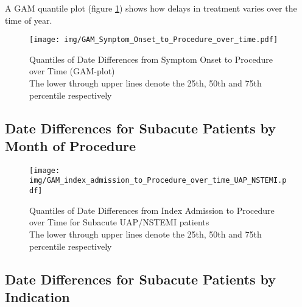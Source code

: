 \documentclass[presentation,xcolor=pdftex,dvipsnames,table,11pt]{beamer}
\begin{document}
\begin{tiny}
\begin{frame}
A GAM quantile plot (figure \ref{GAM: Date Differences from Symptom Onset to Procedure over Time}) shows how delays in treatment varies over the time of year.

\begin{figure}
  \centering
  \caption{Quantiles of Date Differences from Symptom Onset to Procedure over Time (GAM-plot)\\
  The lower through upper lines denote the 25th, 50th and 75th percentile respectively}
  \label{GAM: Date Differences from Symptom Onset to Procedure over Time}
\texttt{[image: img/GAM\_Symptom\_Onset\_to\_Procedure\_over\_time.pdf]}\end{figure}
\end{frame}





\subsection{Date Differences for Subacute Patients by Month of Procedure}

\begin{frame}
\begin{figure}
  \centering
  \caption{Quantiles of Date Differences from Index Admission to Procedure over Time for Subacute UAP/NSTEMI patients\\
  The lower through upper lines denote the 25th, 50th and 75th percentile respectively}
  \label{GAM: Date Differences from Index Admission to Procedure over Time UAP+NSTEMI}
\texttt{[image: img/GAM\_index\_admission\_to\_Procedure\_over\_time\_UAP\_NSTEMI.pdf]}\end{figure}
\end{frame}





\subsection{Date Differences for Subacute Patients by Indication}


\end{tiny}
\end{document}
